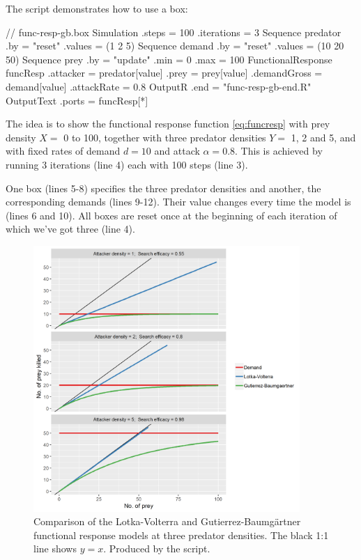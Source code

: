 The  script demonstrates how to use a  box:

\lstset{numbers=left}
\begin{boxscript}
// func-resp-gb.box
Simulation {
  .steps = 100
  .iterations = 3
  Sequence predator {
    .by = "reset"
    .values = (1 2 5)
  }
  Sequence demand {
    .by = "reset"
    .values = (10 20 50)
  }
  Sequence prey {
    .by = "update"
    .min = 0
    .max = 100
  }
  FunctionalResponse funcResp {
    .attacker = predator[value]
    .prey = prey[value]
    .demandGross = demand[value]
    .attackRate = 0.8
  }
  OutputR {
    .end = "func-resp-gb-end.R"
    OutputText {
      .ports = funcResp[*]
    }
  }
}\end{boxscript}
\lstset{numbers=none}

The idea is to show the functional response function \eqref{eq:funcresp} with prey density $X=$ 0 to 100, together with three predator densities $Y=$ 1, 2 and 5, and with fixed rates of demand $d=10$ and attack $\alpha=0.8$. This is achieved by running 3 iterations (line 4) each with 100 steps (line 3).

One  box (lines 5-8) specifies the three predator densities and another, the corresponding demands (lines 9-12). Their value changes every time the model is  (lines 6 and 10). All boxes are reset once at the beginning of each iteration of which we've got three (line 4).

\begin{figure} [ht]
\centering
\includegraphics[width=0.9\textwidth]{graphics/func-resp-gb}
\caption{Comparison of the Lotka-Volterra and Gutierrez-Baumg{\"a}rtner functional response models at three predator densities. The black 1:1 line shows $y=x$. Produced by the  script.}
\label{fig:func-resp-gb}
\end{figure}


